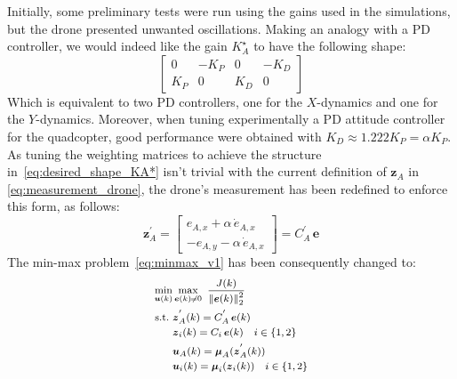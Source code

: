 \documentclass{ifacconf}
\begin{document}
Initially, some preliminary tests were run using the gains used in the simulations,
but the drone presented unwanted oscillations.
Making an analogy with a PD controller, we would indeed like the gain $K^\star_A$
to have the following shape:
\begin{equation}
    \begin{bmatrix}
        0  &  -K_P    &  0  &  -K_D \\
        K_P &     0       & K_D &      0
    \end{bmatrix}
    \label{eq:desired_shape_KA*}
\end{equation}
Which is equivalent to two PD controllers, one for 
the $X$-dynamics and one for the $Y$-dynamics.
Moreover, when tuning experimentally a PD attitude controller 
for the quadcopter, good  performance were obtained 
with $K_D \approx 1.222 K_P = \alpha K_P$.
As tuning the weighting matrices to achieve the structure 
in~\eqref{eq:desired_shape_KA*} isn't trivial with the current definition of 
$\boldsymbol{z}_A$ in \eqref{eq:measurement_drone}, 
the drone's measurement has been redefined to enforce this form, as follows:
\begin{equation}
    \boldsymbol{z}^{'}_A = \begin{bmatrix}
        e_{A,x} + \alpha \, \dot{e}_{A,x} \\ 
        - e_{A,y} - \alpha \, \dot{e}_{A,x}
    \end{bmatrix} = C^{'}_A \, \boldsymbol{e}
\end{equation}
The min-max problem~\eqref{eq:minmax_v1} has been consequently changed to:
\begin{equation}
    \footnotesize
\begin{aligned}
    \min_{\boldsymbol{u}(k)} & \max_{\boldsymbol{e}(k) \neq 0} \ \frac{
    J(k)}{\left\lVert \boldsymbol{e}(k)\right\rVert^2_2} \\
    \textrm{s.t.} \  &\boldsymbol{z}^{'}_A(k) = C^{'}_A \, \boldsymbol{e}(k) \\
    \quad &\boldsymbol{z}_i(k) = C_i \, \boldsymbol{e}(k) \quad i \in \{1,2\} \\
    \quad & \boldsymbol{u}_{A}(k) = \boldsymbol{\mu}_A(\boldsymbol{z}^{'}_A(k))\\
    \quad & \boldsymbol{u}_{i}(k) = \boldsymbol{\mu}_i(\boldsymbol{z}_i(k)) \quad i \in \{1,2\} \\
\end{aligned}
\label{eq:minmax_v2}
\end{equation}
\end{document}
